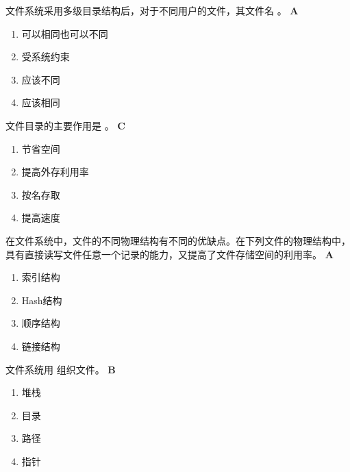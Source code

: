 \begin{problem}
	文件系统采用多级目录结构后，对于不同用户的文件，其文件名 \myline。
	\textbf{A}
	\vspace{-0.5em}
	\begin{multicols}{2}
		\begin{enumerate}[label=\Alph*.]
			\item 可以相同也可以不同
			\item 受系统约束
			\item 应该不同
			\item 应该相同
		\end{enumerate}
	\end{multicols}
	\vspace{-1em}
\end{problem}


\begin{problem}
	文件目录的主要作用是 \myline。
	\textbf{C}
	\vspace{-0.5em}
	\begin{multicols}{4}
		\begin{enumerate}[label=\Alph*.]
			\item 节省空间
			\item 提高外存利用率
			\item 按名存取
			\item 提高速度
		\end{enumerate}
	\end{multicols}
	\vspace{-1em}
\end{problem}


\begin{problem}
	在文件系统中，文件的不同物理结构有不同的优缺点。在下列文件的物理结构中，\myline 具有直接读写文件任意一个记录的能力，又提高了文件存储空间的利用率。
	\textbf{A}
	\vspace{-0.5em}
	\begin{multicols}{4}
		\begin{enumerate}[label=\Alph*.]
			\item 索引结构
			\item Hash结构
			\item 顺序结构
			\item 链接结构
		\end{enumerate}
	\end{multicols}
	\vspace{-1em}
\end{problem}


\begin{problem}
	文件系统用 \myline 组织文件。
	\textbf{B}
	\vspace{-0.5em}
	\begin{multicols}{4}
		\begin{enumerate}[label=\Alph*.]
			\item 堆栈
			\item 目录
			\item 路径
			\item 指针
		\end{enumerate}
	\end{multicols}
	\vspace{-1em}
\end{problem}


